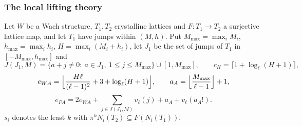 \subsubsection{The local lifting theory}

Let $W$ be a Wach structure, $T_1,T_2$ crystalline lattices and $F\colon T_1\to T_2$ a surjective lattice map, and let $T_1$ have jumps within
$(M,h)$. Put $M_{\max}=\max_iM_i$, $h_{\max}=\max_ih_i$, $H=\max_i(M_i+h_i)$, let $J_1$ be the set of jumps of $T_1$ in $[-M_{\max},h_{\max}]$ and
\[
J(J_1,M)=\{a+j\ne0:\ a\in J_1,\ 1\le j\le M_{\max}\}\cup[1,M_{\max}],\qquad c_H=\lceil1+\log_\ell(H+1)\rceil,
\]
\[
e_{WA}=\Bigl\lfloor\frac{H\ell}{(\ell-1)^2}+3+\log_\ell(H+1)\Bigr\rfloor,\qquad a_A=\Bigl\lfloor\frac{M_{\max}}{\ell-1}\Bigr\rfloor+1,
\]
\[
e_{PA}=2e_{WA}+\sum_{j\in J(J_1,M)}v_\ell(j)+a_A+v_\ell(a_A!).
\]
$s_i$ denotes the least $k$ with $\pi^kN_i(T_2)\subseteq F(N_i(T_1))$.

